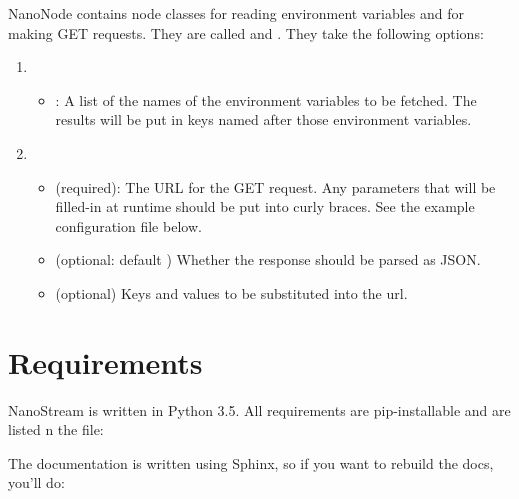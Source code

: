 \documentclass[letterpaper,10pt,english]{sphinxmanual}
\begin{document}
NanoNode contains node classes for reading environment variables and for making
GET requests. They are called  and
. They take the following options:
\begin{enumerate}
\def\theenumi{\arabic{enumi}}
\def\labelenumi{\theenumi .}
\makeatletter\def\p@enumii{\p@enumi \theenumi .}\makeatother
\item {} 
\begin{itemize}
\item {} 
: A list of the names of the environment variables to be fetched. The results will be put in keys named after those environment variables.

\end{itemize}

\item {} 
\begin{itemize}
\item {} 
 (required): The URL for the GET request. Any parameters that will be filled-in
at runtime should be put into curly braces. See the example configuration
file below.

\item {} 
 (optional: default ) Whether the response should be parsed as JSON.

\item {} 
 (optional) Keys and values to be substituted into the
url.

\end{itemize}

\end{enumerate}


\chapter{Requirements}
\label{\detokenize{requirements:requirements}}\label{\detokenize{requirements::doc}}
NanoStream is written in Python 3.5. All requirements are pip-installable and
are listed n the  file:


The documentation is written using Sphinx, so if you want to rebuild the docs,
you’ll do:
\end{document}

